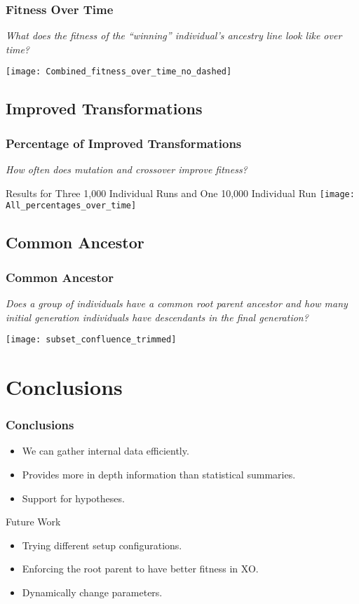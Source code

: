 \documentclass{beamer}
\newcommand{\linespace}{\vskip 0.25cm}
\begin{document}
\begin{frame}
\frametitle{Fitness Over Time}
\emph{What does the fitness of the ``winning'' individual's ancestry line look like over time?}
\begin{center}
\texttt{[image: Combined\_fitness\_over\_time\_no\_dashed]}
\end{center}
\end{frame}

\subsection[Improved Transformations]{Improved Transformations}

\begin{frame}
\frametitle{Percentage of Improved Transformations}
\emph{How often does mutation and crossover improve fitness?}
\begin{center}
{\tiny Results for Three 1,000 Individual Runs and One 10,000 Individual Run}
\texttt{[image: All\_percentages\_over\_time]}
\end{center}
\end{frame}

\subsection[Common Ancestor]{Common Ancestor}

\begin{frame}
\frametitle{Common Ancestor}
\emph{Does a group of individuals have a common root parent ancestor and how many initial generation individuals have descendants in the final generation?}
\begin{center}
\texttt{[image: subset\_confluence\_trimmed]}
\end{center}

\end{frame}

\section[Conclusions]{Conclusions}

\begin{frame}
\frametitle{Conclusions}

\begin{itemize}
\item We can gather internal data efficiently.
\item Provides more in depth information than statistical summaries. 
\item Support for hypotheses.
\end{itemize}
\linespace
\linespace
\linespace
\linespace

Future Work
\begin{itemize}
\item Trying different setup configurations.
\item Enforcing the root parent to have better fitness in XO.
\item Dynamically change parameters.
\end{itemize}
\end{frame}
\end{document}
